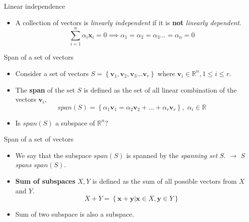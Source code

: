 \documentclass[aspectratio=169]{beamer}
\let\olditem\item
\renewcommand{\item}{\setlength{\itemsep}{\fill}\olditem}
\begin{document}
\begin{frame}[t]{Linear independence}
\begin{itemize}  
  \item A collection of vectors is \textit{linearly independent} if it is \textbf{not} \textit{linearly dependent}.
  $$ \sum_{i=1}^n\alpha_i\mathbf{x}_i = 0 \implies \alpha_1=\alpha_2=\alpha_3\ldots=\alpha_n = 0$$
\end{itemize}
\end{frame}


\begin{frame}[t]{Span of a set of vectors}
\begin{itemize}
    \item Consider a set of vectors $S = \left\{\mathbf{v}_1, \mathbf{v}_2, \mathbf{v}_3 \ldots \mathbf{v}_r\right\}$ where $\mathbf{v}_i \in \mathbb{R}^n, 1 \leq i \leq r$.
    \item The \textbf{span} of the set $S$ is defined as the set of all linear combination of the vectors $\mathbf{v}_i$,
    \[ span\left(S\right) = \left\{\alpha_1\mathbf{v}_1 = \alpha_2\mathbf{v}_2 + \ldots + \alpha_r\mathbf{v}_r\right\}, \,\, \alpha_i \in \mathbb{R} \]
    \item Is $span\left(S\right)$ a subspace of $\mathbb{R}^n$?
\end{itemize}
\end{frame}


\begin{frame}[t]{Span of a set of vectors}
\begin{itemize}
    \item We say that the subspace $span\left(S\right)$ is spanned by the \textit{spanning set} $S$. $\longrightarrow$ $S$ \textit{spans} $span\left(S\right)$.
    \item \textbf{Sum of subspaces} $X, Y$ is defined as the sum of all possible vectors from $X$ and $Y$.
    \[ X + Y = \left\{\mathbf{x} + \mathbf{y} \left|\right. \mathbf{x} \in X, \mathbf{y} \in Y\right\} \]
    \item Sum of two subspace is also a subspace.
\end{itemize}
\end{frame}
\end{document}
